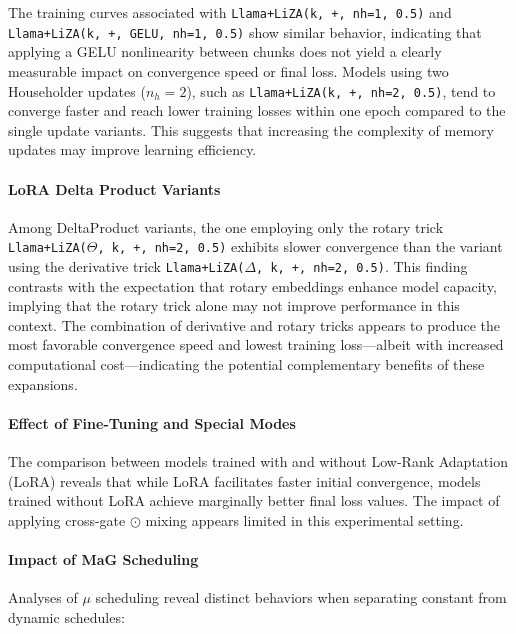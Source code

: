 \documentclass[10pt,a4paper]{article}
\begin{document}
The training curves associated with \texttt{Llama+LiZA(k, +, nh=1, 0.5)} and \texttt{Llama+LiZA(k, +, GELU, nh=1, 0.5)} show similar behavior, indicating that applying a GELU nonlinearity between chunks does not yield a clearly measurable impact on convergence speed or final loss. Models using two Householder updates (\(n_h=2\)), such as \texttt{Llama+LiZA(k, +, nh=2, 0.5)}, tend to converge faster and reach lower training losses within one epoch compared to the single update variants. This suggests that increasing the complexity of memory updates may improve learning efficiency.

\paragraph{LoRA Delta Product Variants}

Among DeltaProduct variants, the one employing only the rotary trick 
\texttt{Llama+LiZA(}\(\Theta\)\texttt{, k, +, nh=2, 0.5)} exhibits slower convergence than the variant using the derivative trick \texttt{Llama+LiZA(}\(\Delta\)\texttt{, k, +, nh=2, 0.5)}. This finding contrasts with the expectation that rotary embeddings enhance model capacity, implying that the rotary trick alone may not improve performance in this context. The combination of derivative and rotary tricks appears to produce the most favorable convergence speed and lowest training loss—albeit with increased computational cost—indicating the potential complementary benefits of these expansions.

\paragraph{Effect of Fine-Tuning and Special Modes}

The comparison between models trained with and without Low-Rank Adaptation (LoRA) reveals that while LoRA facilitates faster initial convergence, models trained without LoRA achieve marginally better final loss values. The impact of applying cross-gate $\odot$ mixing appears limited in this experimental setting.

\paragraph{Impact of MaG Scheduling}

Analyses of \(\mu\) scheduling reveal distinct behaviors when separating constant from dynamic schedules:
\end{document}
